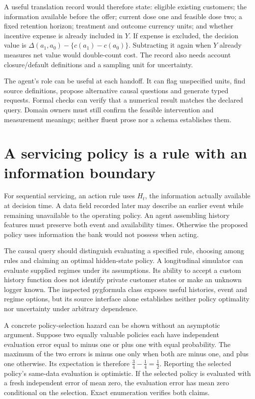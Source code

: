 A useful translation record would therefore state: eligible existing customers;
the information available before the offer; current dose one and feasible dose
two; a fixed retention horizon; treatment and outcome currency units; and
whether incentive expense is already included in $Y$. If expense is excluded,
the decision value is $\Delta(a_1,a_0)-\{c(a_1)-c(a_0)\}$. Subtracting it again
when $Y$ already measures net value would double-count cost. The record also
needs account closure/default definitions and a sampling unit for uncertainty.

The agent's role can be useful at each handoff. It can flag unspecified units,
find source definitions, propose alternative causal questions and generate
typed requests. Formal checks can verify that a numerical result matches the
declared query. Domain owners must still confirm the feasible intervention and
measurement meanings; neither fluent prose nor a schema establishes them.

\section{A servicing policy is a rule with an information boundary}

For sequential servicing, an action rule uses $H_t$, the information actually
available at decision time. A data field recorded later may describe an earlier
event while remaining unavailable to the operating policy. An agent assembling
history features must preserve both event and availability times. Otherwise
the proposed policy uses information the bank would not possess when acting.

The causal query should distinguish evaluating a specified rule, choosing among
rules and claiming an optimal hidden-state policy. A longitudinal simulator can
evaluate supplied regimes under its assumptions. Its ability to accept a custom
history function does not identify private customer states or make an unknown
logger known. The inspected pygformula class exposes useful histories, event
and regime options, but its source interface alone establishes neither policy
optimality nor uncertainty under arbitrary dependence. \cite{v13_sw_pygformula}

A concrete policy-selection hazard can be shown without an asymptotic argument.
Suppose two equally valuable policies each have independent evaluation error
equal to minus one or plus one with equal probability. The maximum of the two
errors is minus one only when both are minus one, and plus one otherwise.
Its expectation is therefore $\tfrac34-\tfrac14=\tfrac12$. Reporting the
selected policy's same-data evaluation is optimistic. If the selected policy
is evaluated with a fresh independent error of mean zero, the evaluation error
has mean zero conditional on the selection. Exact enumeration verifies both
claims. \cite{v13_project_exact}

